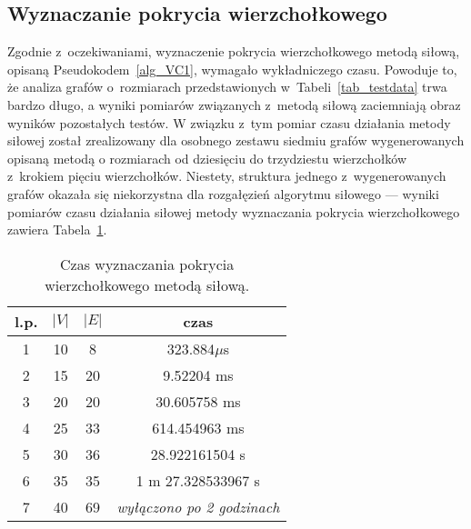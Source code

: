\subsection{Wyznaczanie pokrycia wierzchołkowego}
\par{
  Zgodnie z~oczekiwaniami, wyznaczenie pokrycia wierzchołkowego metodą siłową, opisaną Pseudokodem~\ref{alg_VC1}, wymagało wykładniczego czasu.
  Powoduje to, że analiza grafów o~rozmiarach przedstawionych w~Tabeli~\ref{tab_testdata} trwa bardzo długo, a wyniki pomiarów związanych z~metodą siłową zaciemniają obraz wyników pozostałych testów.
  W związku z~tym pomiar czasu działania metody siłowej został zrealizowany dla osobnego zestawu siedmiu grafów wygenerowanych opisaną metodą o rozmiarach od dziesięciu do trzydziestu wierzchołków z~krokiem pięciu wierzchołków.
  Niestety, struktura jednego z~wygenerowanych grafów okazała się niekorzystna dla rozgałęzień algorytmu siłowego --- wyniki pomiarów czasu działania siłowej metody wyznaczania pokrycia wierzchołkowego zawiera Tabela~\ref{tab_vc_naive}.
  \begin{table}
    \begin{center}
      \caption{Czas wyznaczania pokrycia wierzchołkowego metodą siłową.}
      \begin{tabular}{| c | c | c | c |}
        \hline
        l.p. & $|V|$ & $|E|$ & czas \\ \hline
        1 & 10 & 8 & 323.884$ \mu$s \\
        2 & 15 & 20 & 9.52204 ms \\
        3 & 20 & 20 & 30.605758 ms \\
        4 & 25 & 33 & 614.454963 ms \\
        5 & 30 & 36 & 28.922161504 s \\
        6 & 35 & 35 & 1 m 27.328533967 s \\
        7 & 40 & 69 & \textit{wyłączono po 2 godzinach} \\ \hline
      \end{tabular} 
    \end{center}
    \label{tab_vc_naive}
  \end{table}
}
